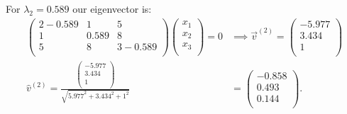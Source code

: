 \begin{derivation}
  For $\lambda_2 = \num{0,589}$ our eigenvector is:
    \begin{align*}
    \begin{pmatrix}
      2 - \num{0,589}  & 1 & 5\\
    1 & \num{0,589}  & 8\\
    5 & 8 & 3 - \num{0,589} \\
    \end{pmatrix} \begin{pmatrix}
      x_1\\
    x_2\\
    x_3\\
    \end{pmatrix} = 0 &\implies \Vec{v}^{(2)} = \begin{pmatrix}
      \num{-5,977} \\
    \num{3,434} \\
    1\\
    \end{pmatrix} \\
    \hat{v}^{(2)} = \frac{\begin{pmatrix}
     - \num{5,977} \\
    \num{3,434} \\
    1\\
\end{pmatrix}}{\sqrt{\num{5,977} ^2 + \num{3,434} ^2 + 1^2}} &= \left(
\begin{array}{c}
  \num{-0.858} \\
\num{0.493 }\\
\num{0.144} \\
\end{array}
\right)
.\end{align*}


\end{derivation}
